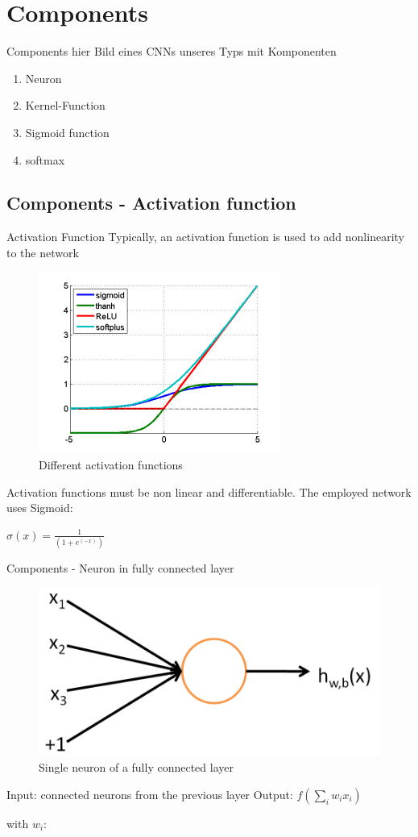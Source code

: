 \documentclass[12pt]{beamer}
\begin{document}
\section{Components}
\begin{frame}{Components}
hier Bild eines CNNs unseres Typs mit Komponenten


\begin{enumerate}
\item Neuron
\item Kernel-Function
\item Sigmoid function
\item softmax
\end{enumerate}

\end{frame}
\subsection{Components - Activation function}
\begin{frame}{Activation Function}
Typically, an activation function is used  to add nonlinearity to the network
\begin{figure}
\centering
\includegraphics[width = 0.4\linewidth]{images/activation_functions.png}
\caption{Different activation functions}
\label{fig:principle}
\end{figure}
Activation functions must be non linear and differentiable. \newline
The employed network uses Sigmoid:

$\sigma(x) = \frac{1}{(1+e^(-x))}$



\end{frame}


\begin{frame}{Components - Neuron in fully connected layer}

\begin{figure}
\centering
\includegraphics[width = 0.4\linewidth]{images/SingleNeuron.png}
\caption{Single neuron of a fully connected layer}
\label{fig:principle}
\end{figure}
Input: connected neurons from the previous layer \newline
Output: $f (\sum_{i}{w_i x_i})$

with \newline
$w_i$: 
\end{frame}
\end{document}
